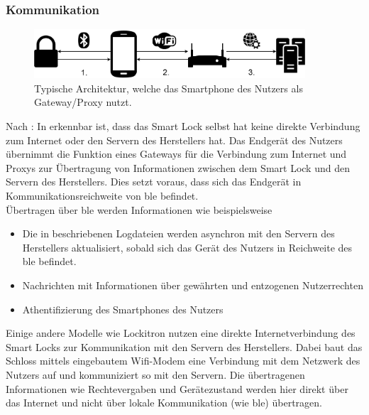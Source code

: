 	\subsubsection{Kommunikation}
	\label{sec:sota_smart_locks_comm}
	    \begin{figure}[H]
    		\centering
    		\includegraphics[width=0.9\textwidth]{graphics/gateway_arch.png}
    		\caption[Typische Architektur eines Smart Locks]{Typische Architektur, welche das Smartphone des Nutzers als Gateway/Proxy nutzt\cite{Ho2016}.}
    		\label{fig:gateway_arch}
    	\end{figure}
	    Nach \cite{Ho2016}:
        In  erkennbar ist, dass das Smart Lock selbst hat keine direkte Verbindung zum Internet oder den Servern des Herstellers hat. 
        Das Endgerät des Nutzers übernimmt die Funktion eines Gateways für die Verbindung zum Internet und Proxys zur Übertragung von Informationen zwischen dem Smart Lock und den Servern des Herstellers. 
        Dies setzt voraus, dass sich das Endgerät in Kommunikationsreichweite von \gls{ble} befindet. 
        \smallskip\\
        Übertragen über \gls{ble} werden Informationen wie beispielsweise
        \begin{itemize}[noitemsep]
            \item Die in  beschriebenen Logdateien werden asynchron mit den Servern des Herstellers aktualisiert, sobald sich das Gerät des Nutzers in Reichweite des \gls{ble} befindet.
            \item Nachrichten mit Informationen über gewährten und entzogenen Nutzerrechten
            \item Athentifizierung des Smartphones des Nutzers 
        \end{itemize}
        
        \noindent Einige andere Modelle wie Lockitron\cite{lockitron} nutzen eine direkte Internetverbindung des Smart Locks zur Kommunikation mit den Servern des Herstellers. 
        Dabei baut das Schloss mittels eingebautem Wifi-Modem eine Verbindung mit dem Netzwerk des Nutzers auf und kommuniziert so mit den Servern. 
        Die übertragenen Informationen wie Rechtevergaben und Gerätezustand werden hier direkt über das Internet und nicht über lokale Kommunikation (wie \gls{ble}) übertragen. 

